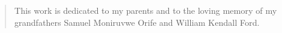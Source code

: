 
\begin{quote}
{This work is dedicated to my parents and to the 
loving memory of my grandfathers Samuel Moniruvwe Orife 
and William Kendall Ford.}
\end{quote}



